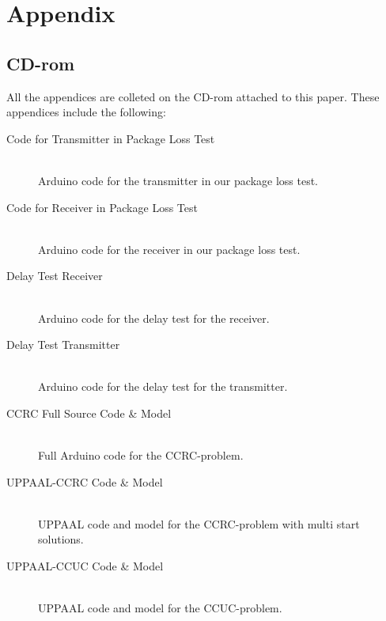 \appendix
\part{Appendix}

\chapter{CD-rom}\label{cdrom}
All the appendices are colleted on the CD-rom attached to this paper.
These appendices include the following: 

\begin{description}
\item[Code for Transmitter in Package Loss Test\label{app:PkgLossTxCode}]\hfill\\
    Arduino code for the transmitter in our package loss test.
%
    
\item[Code for Receiver in Package Loss Test\label{app:PkgLossRxCode}]\hfill\\
    Arduino code for the receiver in our package loss test.
    
\item[Delay Test Receiver\label{app:t2receiver}]\hfill\\
    Arduino code for the delay test for the receiver.
    
\item[Delay Test Transmitter\label{app:t2transmitter}]\hfill\\
    Arduino code for the delay test for the transmitter.

\item[CCRC Full Source Code & Model\label{app:CCRC_CODE}]\hfill\\
    Full Arduino code for the CCRC-problem.
    
\item[UPPAAL-CCRC Code & Model\label{UPPAAL-CCRC-Code}]\hfill\\
    UPPAAL code and model for the CCRC-problem with multi start solutions.
    
\item[UPPAAL-CCUC Code & Model\label{UPPAAL-CCUC-Code}]\hfill\\
    UPPAAL code and model for the CCUC-problem.
\end{description}